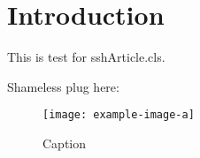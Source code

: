 \documentclass[main]{sshArticle}%
\begin{document}
\maketitle
\section*{Introduction}
This is test for sshArticle.cls.

Shameless plug here: ~\cite{Sung_2022}

\lipsum[1-5]

\begin{figure}
    \centering
    \texttt{[image: example-image-a]}
    \caption{Caption}
    \label{fig:my_label}
\end{figure}
\end{document}

